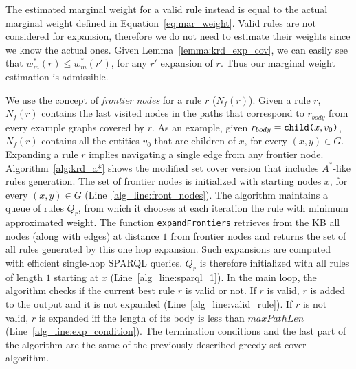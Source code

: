 The estimated marginal weight for a valid rule instead is equal to the actual marginal weight defined in Equation~\ref{eq:mar_weight}. Valid rules are not considered for expansion, therefore we do not need to estimate their weights since we know the actual ones. Given Lemma~\ref{lemma:krd_exp_cov}, we can easily see that $w_m^*(r) \leq w_m^*(r')$, for any $r'$ expansion of $r$. Thus our marginal weight estimation is admissible.

We use the concept of \emph{frontier nodes} for a rule $r$ ($N_f(r)$). Given a rule $r$, $N_f(r)$ contains the last visited nodes in the paths that correspond to $r_{body}$ from every example graphs covered by $r$. As an example, given $r_{body} = \texttt{child(}x,v_0\texttt{)}$, $N_f(r)$ contains all the entities $v_0$ that are children of $x$, for every $(x,y) \in G$. 
Expanding a rule $r$ implies navigating a single edge from any frontier node. Algorithm~\ref{alg:krd_a*} shows the modified set cover version that includes $A^*$-like rules generation. The set of frontier nodes is initialized with starting nodes $x$, for every $(x,y) \in G$ (Line~\ref{alg_line:front_nodes}). The algorithm maintains a queue of rules $Q_r$, from which it chooses at each iteration the rule with minimum approximated weight. 
The function \texttt{expandFrontiers} retrieves from the KB all nodes (along with edges) at distance $1$ from frontier nodes and returns the set of all rules generated by this one hop expansion. Such expansions are computed with efficient single-hop SPARQL queries. $Q_r$ is therefore initialized with all rules of length $1$ starting at $x$ (Line~\ref{alg_line:sparql_1}). In the main loop, the algorithm checks if the current best rule $r$ is valid or not. If $r$ is valid, $r$ is added to the output and it is not expanded (Line~\ref{alg_line:valid_rule}). If $r$ is not valid, $r$ is expanded iff the length of its body is less than $maxPathLen$ (Line~\ref{alg_line:exp_condition}). 
The termination conditions and the last part of the algorithm are the same of the previously described greedy set-cover algorithm. %

\setlength{\textfloatsep}{0pt}%

\setlength{\textfloatsep}{5pt}

